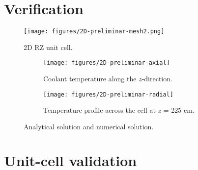 \documentclass[11pt,letterpaper]{article}
\begin{document}
\section{Verification}

	\begin{figure}[htbp!]
		\centering
		\texttt{[image: figures/2D-preliminar-mesh2.png]}
		\hfill
		\caption{2D RZ unit cell.}
		\label{fig:axial}
	\end{figure}

	\begin{figure}[htbp!]
		\centering
		\begin{subfigure}[t]{0.4\textwidth}
			\centering
			\texttt{[image: figures/2D-preliminar-axial]}
			\caption{Coolant temperature along the $z$-direction.}
		\end{subfigure}
		\begin{subfigure}[t]{0.4\textwidth}
			\centering
			\texttt{[image: figures/2D-preliminar-radial]}
			\caption{Temperature profile across the cell at $z$ = 225 cm.}
		\end{subfigure}
		\hfill
		\caption{Analytical solution and numerical solution.}
		\label{fig:verification}
	\end{figure}

\section{Unit-cell validation}



\pagebreak


\end{document}
